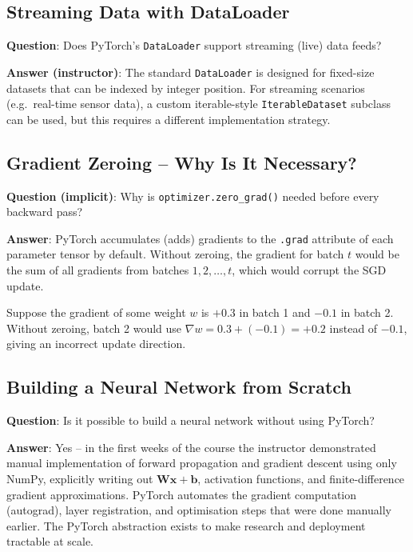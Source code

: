 \documentclass[12pt,a4paper]{article}
\begin{document}
\subsection{Streaming Data with DataLoader}

\textbf{Question}: Does PyTorch's \texttt{DataLoader} support streaming
(live) data feeds?

\textbf{Answer (instructor)}: The standard \texttt{DataLoader} is designed
for fixed-size datasets that can be indexed by integer position.  For
streaming scenarios (e.g.\ real-time sensor data), a custom iterable-style
\texttt{IterableDataset} subclass can be used, but this requires a different
implementation strategy.

\subsection{Gradient Zeroing -- Why Is It Necessary?}

\textbf{Question (implicit)}: Why is \texttt{optimizer.zero\_grad()} needed
before every backward pass?

\textbf{Answer}: PyTorch accumulates (adds) gradients to the
\texttt{.grad} attribute of each parameter tensor by default.  Without
zeroing, the gradient for batch $t$ would be the sum of all gradients from
batches $1, 2, \ldots, t$, which would corrupt the SGD update.

\begin{example}[title=Effect of not zeroing gradients]
Suppose the gradient of some weight $w$ is $+0.3$ in batch 1 and $-0.1$ in
batch 2.  Without zeroing, batch 2 would use $\nabla w = 0.3 + (-0.1) = +0.2$
instead of $-0.1$, giving an incorrect update direction.
\end{example}

\subsection{Building a Neural Network from Scratch}

\textbf{Question}: Is it possible to build a neural network without using
PyTorch?

\textbf{Answer}: Yes -- in the first weeks of the course the instructor
demonstrated manual implementation of forward propagation and gradient descent
using only NumPy, explicitly writing out $\mathbf{W}\mathbf{x} + \mathbf{b}$,
activation functions, and finite-difference gradient approximations.  PyTorch
automates the gradient computation (autograd), layer registration, and
optimisation steps that were done manually earlier.  The PyTorch abstraction
exists to make research and deployment tractable at scale.
\end{document}
